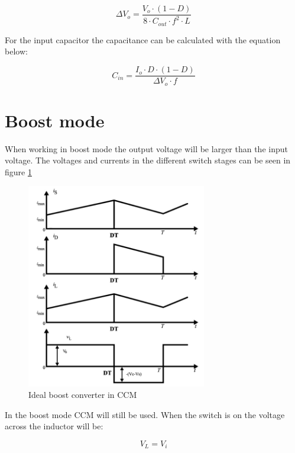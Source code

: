 \begin{equation} \label{buckc} 
\Delta V_o = \frac{V_{o}\cdot (1-D)}{8\cdot C_{out}\cdot f^2\cdot L}
\end{equation}  \cite{buck_equation}  

For the input capacitor the capacitance can be calculated with the equation below:

\begin{equation}
\label{buckcin}
C_{in} = \frac{I_o\cdot D\cdot (1-D)}{\Delta V_o\cdot f}
\end{equation} \cite{underthehood} 

\section{Boost mode}
When working in boost mode the output voltage will be larger than the input voltage. The voltages and currents in the different switch stages can be seen in figure \ref{CCM_boost}

\begin{figure}[htbp]
	\begin{center}
		\includegraphics[width=0.7\textwidth]{../Pictures/CCM_boost}
		\caption{Ideal boost converter in CCM \cite{CCM_boost}}
		\label{CCM_boost}
	\end{center}	
\end{figure}
In the boost mode CCM will still be used. When the switch is on the voltage across the inductor will be:

\begin{equation}
V_L = V_i
\end{equation}

